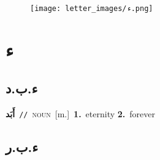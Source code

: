 \documentclass[10pt,a4paper,twoside]{article} %
\begin{document}
\begin{figure*}[t!]\centering\texttt{[image: letter\_images/ء.png]}\end{figure*}
\color{white}

 \section*{\foreignlanguage{arabic}{ء}} 
 \begin{multicols}{2} 

\color{black}
\vspace{-7mm}
\subsection*{\foreignlanguage{arabic}{ء.ب.د}} 

{\setlength\topsep{0pt}\textbf{\foreignlanguage{arabic}{أَبَد}}\ {\color{gray}\texttt{//}\color{black}}\ \textsc{noun}\ [m.]\ \textbf{1.}~eternity  \textbf{2.}~forever\ } \vspace{2mm}

\vspace{-7mm}
\subsection*{\foreignlanguage{arabic}{ء.ب.ر}} 


\end{multicols}
\end{document}
